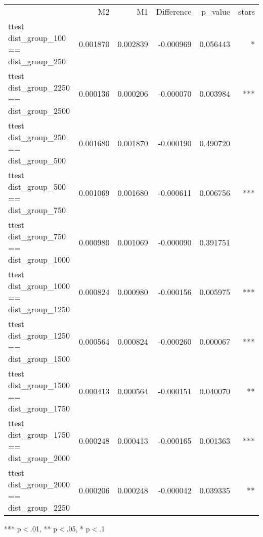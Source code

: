 \documentclass{article}
\begin{document}
\begin{table}[!h]
\centering
\begin{tabular}{llllll}
\cline{1-6}
\multicolumn{1}{c}{} &
  \multicolumn{1}{|r}{M2} &
  \multicolumn{1}{r}{M1} &
  \multicolumn{1}{r}{Difference} &
  \multicolumn{1}{r}{p\_value} &
  \multicolumn{1}{r}{stars} \\
\cline{1-6}
\multicolumn{1}{l}{ttest dist\_group\_100 == dist\_group\_250} &
  \multicolumn{1}{|r}{0.001870} &
  \multicolumn{1}{r}{0.002839} &
  \multicolumn{1}{r}{-0.000969} &
  \multicolumn{1}{r}{0.056443} &
  \multicolumn{1}{r}{*} \\
\multicolumn{1}{l}{ttest dist\_group\_2250 == dist\_group\_2500} &
  \multicolumn{1}{|r}{0.000136} &
  \multicolumn{1}{r}{0.000206} &
  \multicolumn{1}{r}{-0.000070} &
  \multicolumn{1}{r}{0.003984} &
  \multicolumn{1}{r}{***} \\
\multicolumn{1}{l}{ttest dist\_group\_250 == dist\_group\_500} &
  \multicolumn{1}{|r}{0.001680} &
  \multicolumn{1}{r}{0.001870} &
  \multicolumn{1}{r}{-0.000190} &
  \multicolumn{1}{r}{0.490720} &
  \multicolumn{1}{r}{} \\
\multicolumn{1}{l}{ttest dist\_group\_500 == dist\_group\_750} &
  \multicolumn{1}{|r}{0.001069} &
  \multicolumn{1}{r}{0.001680} &
  \multicolumn{1}{r}{-0.000611} &
  \multicolumn{1}{r}{0.006756} &
  \multicolumn{1}{r}{***} \\
\multicolumn{1}{l}{ttest dist\_group\_750 == dist\_group\_1000} &
  \multicolumn{1}{|r}{0.000980} &
  \multicolumn{1}{r}{0.001069} &
  \multicolumn{1}{r}{-0.000090} &
  \multicolumn{1}{r}{0.391751} &
  \multicolumn{1}{r}{} \\
\multicolumn{1}{l}{ttest dist\_group\_1000 == dist\_group\_1250} &
  \multicolumn{1}{|r}{0.000824} &
  \multicolumn{1}{r}{0.000980} &
  \multicolumn{1}{r}{-0.000156} &
  \multicolumn{1}{r}{0.005975} &
  \multicolumn{1}{r}{***} \\
\multicolumn{1}{l}{ttest dist\_group\_1250 == dist\_group\_1500} &
  \multicolumn{1}{|r}{0.000564} &
  \multicolumn{1}{r}{0.000824} &
  \multicolumn{1}{r}{-0.000260} &
  \multicolumn{1}{r}{0.000067} &
  \multicolumn{1}{r}{***} \\
\multicolumn{1}{l}{ttest dist\_group\_1500 == dist\_group\_1750} &
  \multicolumn{1}{|r}{0.000413} &
  \multicolumn{1}{r}{0.000564} &
  \multicolumn{1}{r}{-0.000151} &
  \multicolumn{1}{r}{0.040070} &
  \multicolumn{1}{r}{**} \\
\multicolumn{1}{l}{ttest dist\_group\_1750 == dist\_group\_2000} &
  \multicolumn{1}{|r}{0.000248} &
  \multicolumn{1}{r}{0.000413} &
  \multicolumn{1}{r}{-0.000165} &
  \multicolumn{1}{r}{0.001363} &
  \multicolumn{1}{r}{***} \\
\multicolumn{1}{l}{ttest dist\_group\_2000 == dist\_group\_2250} &
  \multicolumn{1}{|r}{0.000206} &
  \multicolumn{1}{r}{0.000248} &
  \multicolumn{1}{r}{-0.000042} &
  \multicolumn{1}{r}{0.039335} &
  \multicolumn{1}{r}{**} \\
\cline{1-6}
\end{tabular}

\footnotesize{
*** p$<$.01, ** p$<$.05, * p$<$.1
}
\end{table}
\end{document}

